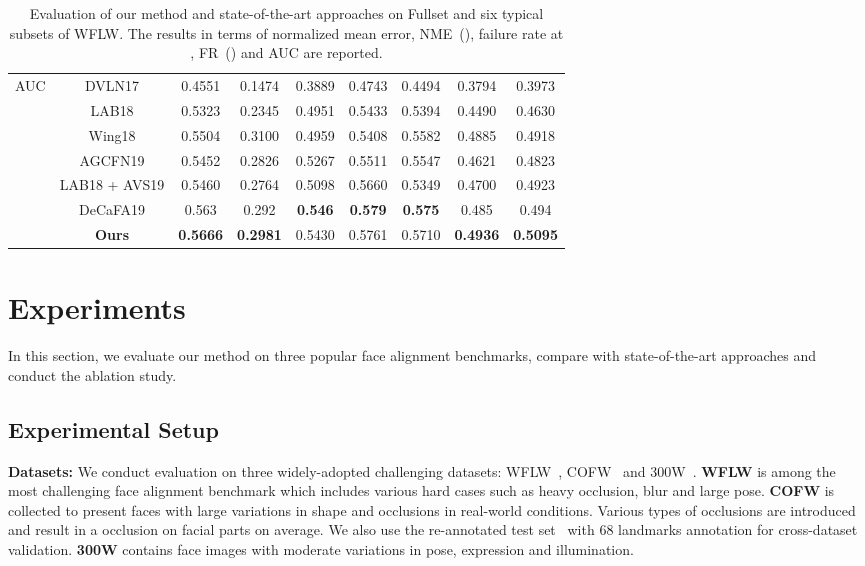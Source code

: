 \documentclass[runningheads]{llncs}
\begin{document}
\begin{table*}[t]
{\begin{tabular}{c|c|c|c|c|c|c|c|c}
			\multirow{6}{*}{AUC}        & DVLN\tiny{17}\small{\cite{DVLN}}     & 0.4551  & 0.1474 & 0.3889 & 0.4743 & 0.4494 & 0.3794 & 0.3973 \\
			& LAB\tiny{18} \small{\cite{lab}}       & 0.5323  & 0.2345 & 0.4951 & 0.5433 & 0.5394 & 0.4490 & 0.4630  \\
			& Wing\tiny{18} \small{\cite{wing}}     & 0.5504  & 0.3100 & 0.4959 & 0.5408 & 0.5582 & 0.4885 & 0.4918  \\ 
			& AGCFN\tiny{19} \small{\cite{AGCFN}}        & 0.5452  & 0.2826 & 0.5267 & 0.5511 & 0.5547 & 0.4621 & 0.4823  \\ 
			&LAB\tiny{18} \small{\cite{lab}} + AVS\tiny{19} \small{\cite{AVS}}  & 0.5460  & 0.2764 & 0.5098 & 0.5660 & 0.5349 & 0.4700 & 0.4923 \\ 
			& DeCaFA\tiny{19} \small{\cite{DeCaFA}} & 0.563   & 0.292  & \textbf{0.546}  & \textbf{0.579}  & \textbf{0.575}  & 0.485  & 0.494 \\
			& \textbf{Ours}                                       & \textbf{0.5666}  & \textbf{0.2981} & {0.5430} & {0.5761} & {0.5710} & \textbf{0.4936} & \textbf{0.5095} \\\hline
			
		\end{tabular}
	}
	\caption{Evaluation of our method and state-of-the-art approaches on Fullset and six typical subsets of WFLW. The results in terms of normalized mean error, NME~(), failure rate at , FR~() and AUC are reported.}
	\label{tab:WFLW}
\end{table*}


\section{Experiments}
In this section, we evaluate our method on three popular face alignment benchmarks, compare with state-of-the-art approaches and conduct the ablation study. 


\subsection{Experimental Setup}

\textbf{Datasets:} We conduct evaluation on three widely-adopted challenging datasets: WFLW~\cite{lab}, COFW~\cite{RCPR} and 300W~\cite{300W}.
\textbf{WFLW} is among the most challenging face alignment benchmark which includes various hard cases such as heavy occlusion, blur and large pose.
\textbf{COFW} is collected to present faces with large variations in shape and occlusions in real-world conditions.
Various types of occlusions are introduced and result in a  occlusion on facial parts on average.
We also use the re-annotated test set~\cite{HPM} with 68 landmarks annotation for cross-dataset validation.
\textbf{300W} contains face images with moderate variations in pose, expression and illumination. 
\end{document}
